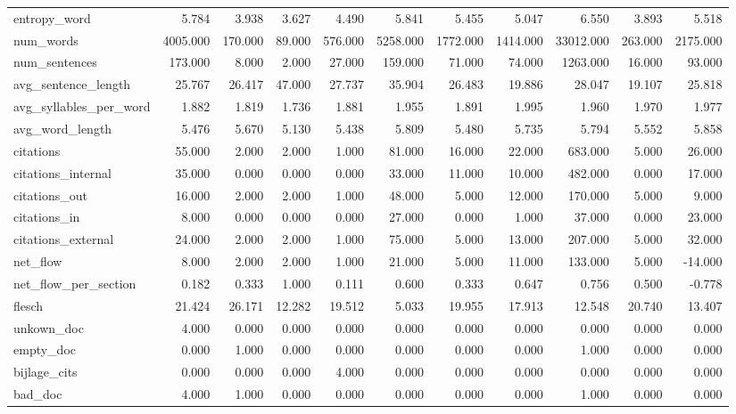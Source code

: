 \begin{tabular}{lrrrrrrrrrr}
\cline{1-11}
entropy\_word & 5.784 & 3.938 & 3.627 & 4.490 & 5.841 & 5.455 & 5.047 & 6.550 & 3.893 & 5.518 \\
\cline{1-11}
num\_words & 4005.000 & 170.000 & 89.000 & 576.000 & 5258.000 & 1772.000 & 1414.000 & 33012.000 & 263.000 & 2175.000 \\
\cline{1-11}
num\_sentences & 173.000 & 8.000 & 2.000 & 27.000 & 159.000 & 71.000 & 74.000 & 1263.000 & 16.000 & 93.000 \\
\cline{1-11}
avg\_sentence\_length & 25.767 & 26.417 & 47.000 & 27.737 & 35.904 & 26.483 & 19.886 & 28.047 & 19.107 & 25.818 \\
\cline{1-11}
avg\_syllables\_per\_word & 1.882 & 1.819 & 1.736 & 1.881 & 1.955 & 1.891 & 1.995 & 1.960 & 1.970 & 1.977 \\
\cline{1-11}
avg\_word\_length & 5.476 & 5.670 & 5.130 & 5.438 & 5.809 & 5.480 & 5.735 & 5.794 & 5.552 & 5.858 \\
\cline{1-11}
citations & 55.000 & 2.000 & 2.000 & 1.000 & 81.000 & 16.000 & 22.000 & 683.000 & 5.000 & 26.000 \\
\cline{1-11}
citations\_internal & 35.000 & 0.000 & 0.000 & 0.000 & 33.000 & 11.000 & 10.000 & 482.000 & 0.000 & 17.000 \\
\cline{1-11}
citations\_out & 16.000 & 2.000 & 2.000 & 1.000 & 48.000 & 5.000 & 12.000 & 170.000 & 5.000 & 9.000 \\
\cline{1-11}
citations\_in & 8.000 & 0.000 & 0.000 & 0.000 & 27.000 & 0.000 & 1.000 & 37.000 & 0.000 & 23.000 \\
\cline{1-11}
citations\_external & 24.000 & 2.000 & 2.000 & 1.000 & 75.000 & 5.000 & 13.000 & 207.000 & 5.000 & 32.000 \\
\cline{1-11}
net\_flow & 8.000 & 2.000 & 2.000 & 1.000 & 21.000 & 5.000 & 11.000 & 133.000 & 5.000 & -14.000 \\
\cline{1-11}
net\_flow\_per\_section & 0.182 & 0.333 & 1.000 & 0.111 & 0.600 & 0.333 & 0.647 & 0.756 & 0.500 & -0.778 \\
\cline{1-11}
flesch & 21.424 & 26.171 & 12.282 & 19.512 & 5.033 & 19.955 & 17.913 & 12.548 & 20.740 & 13.407 \\
\cline{1-11}
unkown\_doc & 4.000 & 0.000 & 0.000 & 0.000 & 0.000 & 0.000 & 0.000 & 0.000 & 0.000 & 0.000 \\
\cline{1-11}
empty\_doc & 0.000 & 1.000 & 0.000 & 0.000 & 0.000 & 0.000 & 0.000 & 1.000 & 0.000 & 0.000 \\
\cline{1-11}
bijlage\_cits & 0.000 & 0.000 & 0.000 & 4.000 & 0.000 & 0.000 & 0.000 & 0.000 & 0.000 & 0.000 \\
\cline{1-11}
bad\_doc & 4.000 & 1.000 & 0.000 & 0.000 & 0.000 & 0.000 & 0.000 & 1.000 & 0.000 & 0.000 \\
\cline{1-11}
\bottomrule
\end{tabular}
